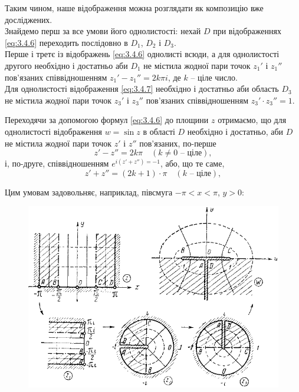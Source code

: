 Таким чином, наше відображення можна розглядати як композицію вже досліджених. \\

Знайдемо перш за все умови його однолистості: нехай $D$ при відображеннях \eqref{eq:3.4.6} переходить послідовно в $D_1$, $D_2$ і $D_3$. \\

Перше і третє із відображень \eqref{eq:3.4.6} однолисті всюди, а для однолистості другого необхідно і достатньо аби $D_1$ не містила жодної пари точок $z_1'$ і $z_1''$ пов'язаних співвідношенням $z_1' - z_1'' = 2 k \pi i$, де $k$ -- ціле число. \\

Для однолистості відображення \eqref{eq:3.4.7} необхідно і достатньо аби область $D_3$ не містила жодної пари точок $z_3'$ і $z_3''$ пов'язаних співвідношенням $z_3' \cdot z_3'' = 1$.

Переходячи за допомогою формул \eqref{eq:3.4.6} до площини $z$ отримаємо, що для однолистості відображення $w = \sin z$ в області $D$ необхідно і достатньо, аби $D$ не містила жодної пари точок $z'$ і $z''$ пов'язаних, по-перше
\begin{equation}
	\label{eq:3.4.8}
	z' - z'' = 2 k \pi \quad (k \ne 0\text{ -- ціле}),
\end{equation}
і, по-друге, співвідношенням $e^{i(z' + z'') = -1}$, або, що те саме,
\begin{equation}
	\label{eq:3.4.9}
	z' + z'' = (2k + 1) \cdot \pi \quad (k\text{ -- ціле}),
\end{equation}

Цим умовам задовольняє, наприклад, півсмуга $- \pi < x < \pi$, $y > 0$:
\begin{figure}[H]
	\centering
	\includegraphics[width=.8\linewidth]{mal-15.png}
\end{figure}

